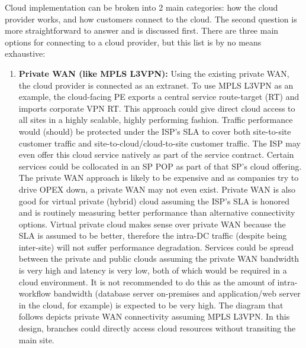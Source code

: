 Cloud implementation can be broken into 2 main categories: how the cloud
provider works, and how customers connect to the cloud. The second question is
more straightforward to answer and is discussed first. There are three main
options for connecting to a cloud provider, but this list is by no means
exhaustive:

\begin{enumerate}
  \item \textbf{Private WAN (like MPLS L3VPN):} Using the existing private WAN, the
  cloud provider is connected as an extranet. To use MPLS L3VPN as an example,
  the cloud-facing PE exports a central service route-target (RT) and imports
  corporate VPN RT\@. This approach could give direct cloud access to all sites
  in a highly scalable, highly performing fashion. Traffic performance would
  (should) be protected under the ISP’s SLA to cover both site-to-site
  customer traffic and site-to-cloud/cloud-to-site customer traffic. The ISP
  may even offer this cloud service natively as part of the service contract.
  Certain services could be collocated in an SP POP as part of that SP's cloud
  offering. The private WAN approach is likely to be expensive and as
  companies try to drive OPEX down, a private WAN may not even exist. Private
  WAN is also good for virtual private (hybrid) cloud assuming the ISP’s SLA
  is honored and is routinely measuring better performance than alternative
  connectivity options. Virtual private cloud makes sense over private WAN
  because the SLA is assumed to be better, therefore the intra-DC traffic
  (despite being inter-site) will not suffer performance degradation. Services
  could be spread between the private and public clouds assuming the private
  WAN bandwidth is very high and latency is very low, both of which would be
  required in a cloud environment. It is not recommended to do this as the
  amount of intra-workflow bandwidth (database server on-premises and
  application/web server in the cloud, for example) is expected to be very
  high. The diagram that follows depicts private WAN connectivity
  assuming MPLS L3VPN\@. In this design, branches could directly access cloud
  resources without transiting the main site.



\end{enumerate}
